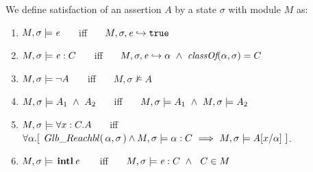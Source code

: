 \begin{definition} 
\label{def:chainmail-semantics}
We define satisfaction of an assertion $A$ by a %
state $\sigma$ with 
 module $M$ as:
\begin{enumerate}
\item
\label{cExpr}
$M , \sigma \models {\mathit{e}}$ \ \ \ iff \ \ \  $M, \sigma, {\mathit{e}} \hookrightarrow \texttt{true}$
\item
\label{cClass}
$M , \sigma \models {{\mathit{e}}} : C$ \ \ \ iff \ \ \  $M, \sigma, {\mathit{e}} \hookrightarrow \alpha\   \wedge \ \textit{classOf}(\alpha, \sigma)= C$
\item
$M , \sigma \models \neg A$ \ \ \ iff \ \ \  ${M},{\sigma}\nvDash{A}$
\item
$\satisfiesA{M}{\sigma}{A_1\ \wedge\ A_2}$ \ \ \ iff \ \ \  $\satisfiesA{M}{\sigma}{A_1} \   \wedge \ \satisfiesA{M}{\sigma}{A_2}$

\item
\label{quant1}
$M , \sigma \models \forall x:C.A$ \ \ \ iff \ \ \  
 {$\forall \alpha.[\ \GRelevant \alpha \sigma \wedge  \satisfiesA {M}{\sigma} {\alpha:C}  \ \Longrightarrow   \ \satisfiesA{M}{\sigma} {A[x/\alpha]}\ ]$.} 

\item
\label{cInternal}
$M , \sigma \models {\ensuremath{\, \mathbf{intl}}\, {\mathit{e}}\, }$ \ \ \ iff \ \ \   $M , \sigma \models {{\mathit{e}}} : C \ \wedge\ \ C \in M$
\end{enumerate}
\end{definition}

